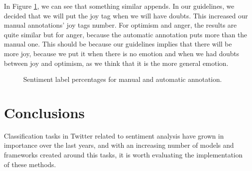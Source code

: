 \documentclass[11pt,a4paper]{article}
\begin{document}
In Figure \ref{fig:pieplots_emotion}, we can see that something similar appends. In our guidelines, we decided that we will put the joy tag when we will have doubts. This increased our manual annotations' joy tags number. For optimism and anger, the results are quite similar but for anger, because the automatic annotation puts more than the manual one. This should be because our guidelines implies that there will be more joy, because we put it when there is no emotion and when we had doubts between joy and optimism, as we think that it is the more general emotion. 

\begin{figure}[ht]
    \centering
    \caption{Sentiment label percentages for manual and automatic annotation.}
    \label{fig:pieplots_emotion}
\end{figure}

\section{Conclusions}

Classification tasks in Twitter related to sentiment analysis have grown in importance over the last years, and with an increasing number of models and frameworks created around this tasks, it is worth evaluating the implementation of these methods. 
\end{document}
